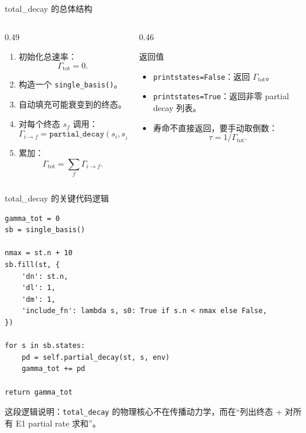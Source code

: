 \documentclass[aspectratio=169,11pt]{ctexbeamer}
\begin{document}
\begin{frame}{total\_decay 的总体结构}
  \begin{columns}[T]
    \begin{column}{0.49\textwidth}
      \begin{enumerate}
        \item 初始化总速率：
          \[
            \Gamma_{\mathrm{tot}}=0.
          \]
        \item 构造一个 \texttt{single\_basis()}。
        \item 自动填充可能衰变到的终态。
        \item 对每个终态 \(s_f\) 调用：
          \[
            \Gamma_{i\rightarrow f}
            =
            \texttt{partial\_decay}(s_i,s_f,\mathrm{env}).
          \]
        \item 累加：
          \[
            \Gamma_{\mathrm{tot}}=\sum_f\Gamma_{i\rightarrow f}.
          \]
      \end{enumerate}
    \end{column}
    \begin{column}{0.46\textwidth}
      \begin{block}{返回值}
        \begin{itemize}
          \item \texttt{printstates=False}：返回 \(\Gamma_{\mathrm{tot}}\)。
          \item \texttt{printstates=True}：返回非零 partial decay 列表。
          \item 寿命不直接返回，要手动取倒数：
            \[
              \tau = 1/\Gamma_{\mathrm{tot}}.
            \]
        \end{itemize}
      \end{block}
    \end{column}
  \end{columns}
\end{frame}

\begin{frame}[fragile]{total\_decay 的关键代码逻辑}
  \scriptsize
  \begin{verbatim}
gamma_tot = 0
sb = single_basis()

nmax = st.n + 10
sb.fill(st, {
    'dn': st.n,
    'dl': 1,
    'dm': 1,
    'include_fn': lambda s, s0: True if s.n < nmax else False,
})

for s in sb.states:
    pd = self.partial_decay(st, s, env)
    gamma_tot += pd

return gamma_tot
  \end{verbatim}

  \vspace{-0.5em}
  这段逻辑说明：\texttt{total\_decay} 的物理核心不在传播动力学，而在“列出终态 + 对所有 E1 partial rate 求和”。
\end{frame}
\end{document}
